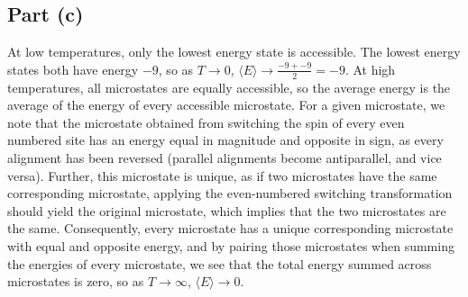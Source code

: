 \documentclass{article}
\begin{document}
\subsection*{Part (c)}
At low temperatures, only the lowest energy state is accessible. The lowest energy states both have energy $-9$, so as $T \to 0$, $\langle E \rangle \to \frac{-9 + -9}{2} = -9$. At high temperatures, all microstates are equally accessible, so the average energy is the average of the energy of every accessible microstate. For a given microstate, we note that the microstate obtained from switching the spin of every even numbered site has an energy equal in magnitude and opposite in sign, as every alignment has been reversed (parallel alignments become antiparallel, and vice versa). Further, this microstate is unique, as if two microstates have the same corresponding microstate, applying the even-numbered switching transformation should yield the original microstate, which implies that the two microstates are the same. Consequently, every microstate has a unique corresponding microstate with equal and opposite energy, and by pairing those microstates when summing the energies of every microstate, we see that the total energy summed across microstates is zero, so as $T \to \infty$, $\langle E \rangle \to 0$. 
\end{document}
